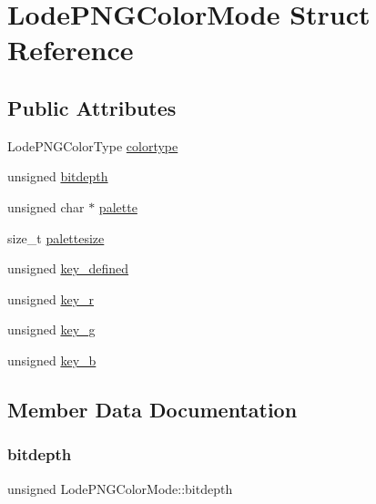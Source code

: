 \hypertarget{struct_lode_p_n_g_color_mode}{}\section{Lode\+P\+N\+G\+Color\+Mode Struct Reference}
\label{struct_lode_p_n_g_color_mode}
\subsection*{Public Attributes}
\begin{DoxyCompactItemize}
\item 
Lode\+P\+N\+G\+Color\+Type \mbox{\hyperlink{struct_lode_p_n_g_color_mode_a4f3df7240411abe80546052d197fbe8d}{colortype}}
\item 
unsigned \mbox{\hyperlink{struct_lode_p_n_g_color_mode_ad20010b9561980f65281bc17f7848253}{bitdepth}}
\item 
unsigned char $\ast$ \mbox{\hyperlink{struct_lode_p_n_g_color_mode_a54f0a793238009fcb95f081626fae308}{palette}}
\item 
size\+\_\+t \mbox{\hyperlink{struct_lode_p_n_g_color_mode_a407557f056168682d9319aeb60866dcc}{palettesize}}
\item 
unsigned \mbox{\hyperlink{struct_lode_p_n_g_color_mode_ab9105505c5d56cfc6ce4efe1bb288b54}{key\+\_\+defined}}
\item 
unsigned \mbox{\hyperlink{struct_lode_p_n_g_color_mode_a29e64327bca1f3d16235e9ff471e4d50}{key\+\_\+r}}
\item 
unsigned \mbox{\hyperlink{struct_lode_p_n_g_color_mode_ad98309f36d289392b0c440baa50af9f6}{key\+\_\+g}}
\item 
unsigned \mbox{\hyperlink{struct_lode_p_n_g_color_mode_a93a269405fee0d1c5045a1a671ed1de8}{key\+\_\+b}}
\end{DoxyCompactItemize}


\subsection{Member Data Documentation}
\mbox{\label{struct_lode_p_n_g_color_mode_ad20010b9561980f65281bc17f7848253}} 
\subsubsection{\texorpdfstring{bitdepth}{bitdepth}}
{\footnotesize\ttfamily unsigned Lode\+P\+N\+G\+Color\+Mode\+::bitdepth}

